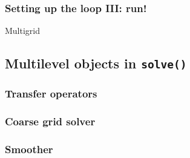 %     
%       
%       
%     

\begin{frame}
  \frametitle{Setting up the loop III: run!}
  \begin{block}{}\small
    
  \end{block}
  \pause
  \begin{block}{Multigrid}\small
    
  \end{block}
\end{frame}
\subsection{Multilevel objects in \lstinline!solve()!}
\begin{frame}
  \frametitle{Transfer operators}
  \begin{block}{}
    
  \end{block}  
\end{frame}

\begin{frame}
  \frametitle{Coarse grid solver}
  \begin{block}{}
    
  \end{block}  
\end{frame}

\begin{frame}
  \frametitle{Smoother}
  \begin{block}{}
    
  \end{block}  
\end{frame}

